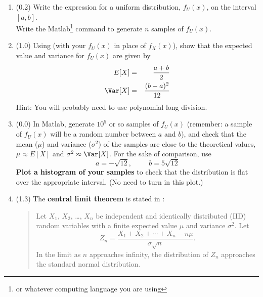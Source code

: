 \documentclass[11pt,titlepage,fleqn]{article}
\begin{document}
\begin{enumerate}
\item (0.2) Write the expression for a uniform distribution, $f_U(x)$, on the interval $[a,b]$. \\
Write the Matlab\footnote{or whatever computing language you are using} command to generate $n$ samples of $f_U(x)$.
\label{fu}


\item (1.0) Using  (with your $f_U(x)$ in place of $f_X(x)$), show that the expected value and variance for $f_U(x)$ are given by
%
\begin{eqnarray}
E[X] &=& \frac{a+b}{2}
\\
\Var[X] &=& \frac{(b-a)^2}{12}
\end{eqnarray}
%
Hint: You will probably need to use polynomial long division.


\item (0.0) In Matlab, generate $10^5$ or so samples of $f_U(x)$ (remember: a sample of $f_U(x)$ will be a random number between $a$ and $b$), and check that the mean ($\mu$) and variance ($\sigma^2$) of the samples are close to the theoretical values, \ie $\mu \approx E[X]$ and $\sigma^2 \approx \Var[X]$. For the sake of comparison, use
%
\begin{equation*}
a = -\sqrt{12},
\hspace{1cm}
b = 5\sqrt{12}
\end{equation*}
%
{\bf Plot a histogram of your samples} to check that the distribution is flat over the appropriate interval. (No need to turn in this plot.)


\pagebreak
\item (1.3) The {\bf central limit theorem} is stated in \citet[][Section B.6]{AsterE2}:
%
\begin{quote}
Let $X_1$, $X_2$, \ldots, $X_n$ be independent and identically distributed (IID) random variables with a finite expected value $\mu$ and variance $\sigma^2$. Let
%
\begin{equation}
Z_n = \frac{X_1 + X_2 + \cdots + X_n - n\mu}{\sigma\sqrt{n}}.
\label{Zn}
\end{equation}
%
In the limit as $n$ approaches infinity, the distribution of $Z_n$ approaches the standard normal distribution.
\end{quote}


\end{enumerate}
\end{document}
